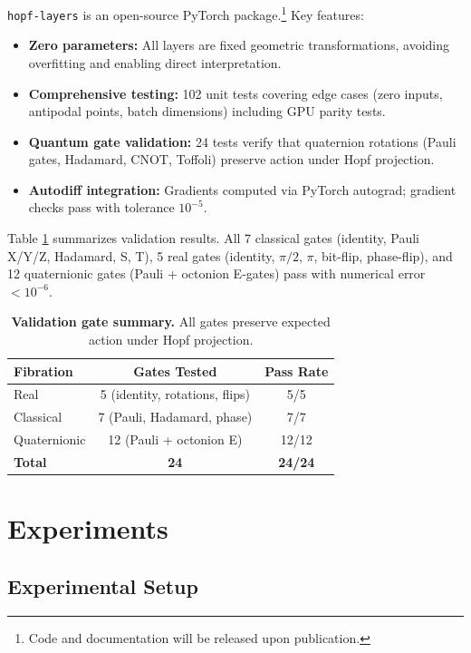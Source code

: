 \documentclass[10pt,twocolumn]{article}
\begin{document}
\texttt{hopf-layers} is an open-source PyTorch package.\footnote{Code and documentation will be released upon publication.} Key features:

\begin{itemize}
\item \textbf{Zero parameters:} All layers are fixed geometric transformations, avoiding overfitting and enabling direct interpretation.
\item \textbf{Comprehensive testing:} 102 unit tests covering edge cases (zero inputs, antipodal points, batch dimensions) including GPU parity tests.
\item \textbf{Quantum gate validation:} 24 tests verify that quaternion rotations (Pauli gates, Hadamard, CNOT, Toffoli) preserve action under Hopf projection.
\item \textbf{Autodiff integration:} Gradients computed via PyTorch autograd; gradient checks pass with tolerance $10^{-5}$.
\end{itemize}

Table \ref{tab:validation} summarizes validation results. All 7 classical gates (identity, Pauli X/Y/Z, Hadamard, S, T), 5 real gates (identity, $\pi/2$, $\pi$, bit-flip, phase-flip), and 12 quaternionic gates (Pauli + octonion E-gates) pass with numerical error $<10^{-6}$.

\begin{table}[!htbp]
\centering
\caption{\textbf{Validation gate summary.} All gates preserve expected action under Hopf projection.}
\label{tab:validation}
\small
\begin{tabular}{@{}lcc@{}}
\toprule
\textbf{Fibration} & \textbf{Gates Tested} & \textbf{Pass Rate} \\
\midrule
Real & 5 (identity, rotations, flips) & 5/5 \\
Classical & 7 (Pauli, Hadamard, phase) & 7/7 \\
Quaternionic & 12 (Pauli + octonion E) & 12/12 \\
\midrule
\textbf{Total} & \textbf{24} & \textbf{24/24} \\
\bottomrule
\end{tabular}
\end{table}

\FloatBarrier
\section{Experiments}

\subsection{Experimental Setup}
\end{document}
